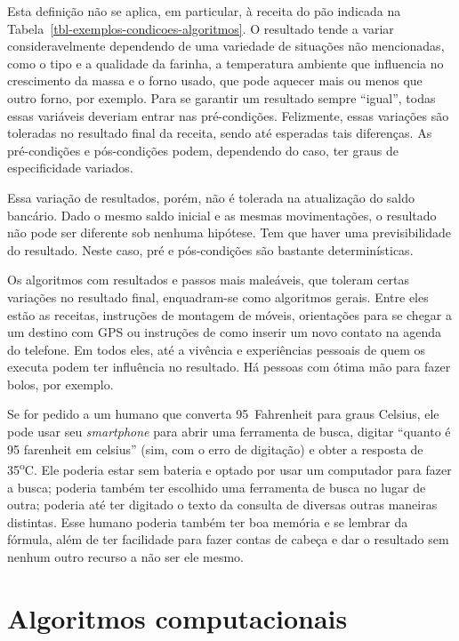 \documentclass[
  11pt,
  a4paper,
]{scrbook}
\begin{document}
Esta definição não se aplica, em particular, à receita do pão indicada
na Tabela~\ref{tbl-exemplos-condicoes-algoritmos}. O resultado tende a
variar consideravelmente dependendo de uma variedade de situações não
mencionadas, como o tipo e a qualidade da farinha, a temperatura
ambiente que influencia no crescimento da massa e o forno usado, que
pode aquecer mais ou menos que outro forno, por exemplo. Para se
garantir um resultado sempre ``igual'', todas essas variáveis deveriam
entrar nas pré-condições. Felizmente, essas variações são toleradas no
resultado final da receita, sendo até esperadas tais diferenças. As
pré-condições e pós-condições podem, dependendo do caso, ter graus de
especificidade variados.

Essa variação de resultados, porém, não é tolerada na atualização do
saldo bancário. Dado o mesmo saldo inicial e as mesmas movimentações, o
resultado não pode ser diferente sob nenhuma hipótese. Tem que haver uma
previsibilidade do resultado. Neste caso, pré e pós-condições são
bastante determinísticas.

Os algoritmos com resultados e passos mais maleáveis, que toleram certas
variações no resultado final, enquadram-se como algoritmos gerais. Entre
eles estão as receitas, instruções de montagem de móveis, orientações
para se chegar a um destino com GPS ou instruções de como inserir um
novo contato na agenda do telefone. Em todos eles, até a vivência e
experiências pessoais de quem os executa podem ter influência no
resultado. Há pessoas com ótima mão para fazer bolos, por exemplo.

Se for pedido a um humano que converta 95~Fahrenheit para graus Celsius,
ele pode usar seu \emph{smartphone} para abrir uma ferramenta de busca,
digitar ``quanto é 95 farenheit em celsius'' (sim, com o erro de
digitação) e obter a resposta de 35\textsuperscript{o}C. Ele poderia
estar sem bateria e optado por usar um computador para fazer a busca;
poderia também ter escolhido uma ferramenta de busca no lugar de outra;
poderia até ter digitado o texto da consulta de diversas outras maneiras
distintas. Esse humano poderia também ter boa memória e se lembrar da
fórmula, além de ter facilidade para fazer contas de cabeça e dar o
resultado sem nenhum outro recurso a não ser ele mesmo.

\section{Algoritmos computacionais}\label{algoritmos-computacionais}
\end{document}
